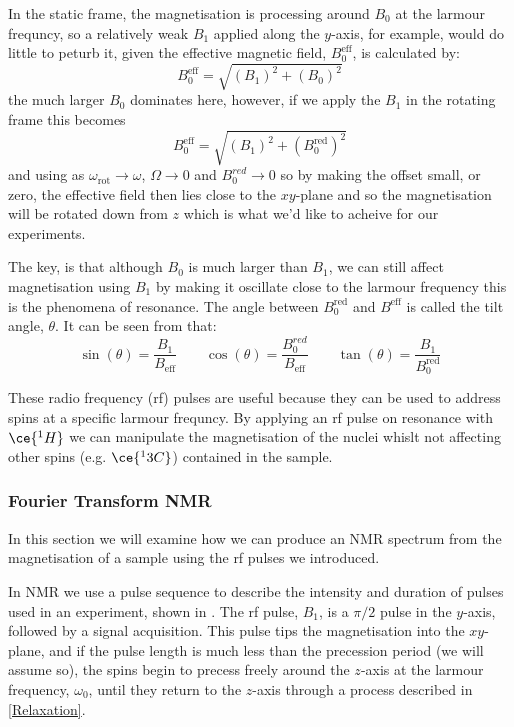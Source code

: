 In the static frame, the magnetisation is processing around $B_0$ at the larmour frequncy, so a relatively weak $B_1$ applied along the $y$-axis, for example, would do little to peturb it, given the effective magnetic field, $B^{\text{eff}}_0$, is calculated by:
\begin{equation}
  B^{\text{eff}}_0 = \sqrt{(B_1)^2+(B_0)^2}
\end{equation}
the much larger $B_0$ dominates here, however, if we apply the $B_1$ in the rotating
frame this becomes
\begin{equation}
  B^{\text{eff}}_0 = \sqrt{(B_1)^2+(B^{\text{red}}_0)^2}
\end{equation}
and using  as $\omega_{\text{rot}}\rightarrow\omega$, $\Omega\rightarrow0$ and $B^{red}_0\rightarrow0$ so by making the offset small, or zero, the effective field
then lies close to the $xy$-plane and so the magnetisation will be rotated down
from $z$ which is what we'd like to acheive for our experiments.

The key, is that although $B_0$ is much larger than $B_1$, we can still affect magnetisation using $B_1$ by making it oscillate close to the larmour frequency
this is the phenomena of resonance. The angle between $B^{\text{red}}_0$ and $B^{\text{eff}}$ is
called the tilt angle, $\theta$. It can be seen from  that:
\begin{equation}
\sin(\theta) = \frac{B_1}{B_{\text{eff}}}\qquad\cos(\theta) = \frac{B^{red}_0}{B_{\text{eff}}}\qquad\tan(\theta) = \frac{B_1}{B^{\text{red}}_0}
\end{equation}

These radio frequency (rf) pulses are useful because they can be used to address spins at a specific larmour
frequncy. By applying an rf pulse on resonance with $\ce{^1H}$ we can manipulate the magnetisation of the nuclei whislt not affecting other spins (e.g. $\ce{^13C}$) contained in the sample.

\subsubsection{Fourier Transform NMR}

In this section we will examine how we can produce an NMR spectrum from the magnetisation of a sample
using the rf pulses we introduced.

In NMR we use a pulse sequence to describe the intensity and duration of pulses used in an
experiment, shown in . The rf pulse, $B_1$, is a $\pi/2$ pulse in the $y$-axis, followed by a signal
acquisition. This pulse tips the magnetisation into the $xy$-plane, and if the pulse length is much less than the
precession period (we will assume so), the spins begin to precess freely around the $z$-axis at the larmour
frequency, $\omega_0$, until they return to the $z$-axis through a process described in \ref{Relaxation}.

